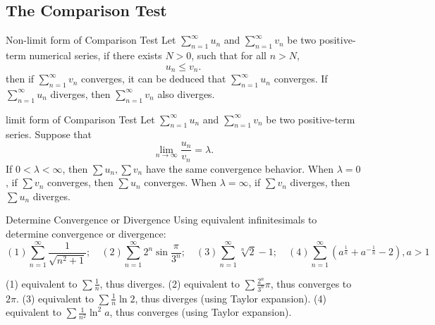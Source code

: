 \subsection{The Comparison Test}

\begin{theorem}{Non-limit form of Comparison Test}{}
  Let $\sum\limits_{n = 1}^{\infty} u_n$ and $\sum\limits_{n = 1}^{\infty}v_n$
  be two positive-term numerical series,
  if there exists $N > 0$, such that for all $n > N$,
  \begin{equation}
    u_n \leq v_n.
  \end{equation}
  then if $\sum\limits_{n = 1}^{\infty} v_n$ converges,
  it can be deduced that $\sum\limits_{n = 1}^{\infty}u_n$ converges.
  If $\sum\limits_{n = 1}^{\infty}u_n$ diverges,
  then $\sum\limits_{n = 1}^{\infty}v_n$ also diverges.
\end{theorem}


\begin{theorem}{limit form of Comparison Test}{}
  Let $\sum\limits_{n = 1}^{\infty} u_n$ and $\sum\limits_{n = 1}^{\infty}v_n$
  be two positive-term series.
  Suppose that
  \begin{equation}
    \lim \limits _{n \rightarrow \infty} \frac{u_n}{v_n} = \lambda.
  \end{equation}
  If $0 < \lambda < \infty$,
  then $\sum u_n, \sum v_n$ have the same convergence behavior.
  When $\lambda = 0$, if $\sum v_n$ converges,
  then $\sum u_n$ converges.
  When $\lambda = \infty$, if $\sum v_n$ diverges,
  then $\sum u_n$ diverges.
\end{theorem}

\begin{example}{Determine Convergence or Divergence}{}
  Using equivalent infinitesimals to determine convergence or divergence:
  \begin{equation}
    (1) \sum\limits_{n = 1}^{\infty} \frac{1}{\sqrt{n^2 + 1}}; \quad
    (2) \sum\limits_{n = 1}^{\infty} 2^n \sin \frac{\pi}{3^n}; \quad
    (3) \sum\limits_{n = 1}^{\infty} \sqrt[n]{2} - 1; \quad
    (4) \sum\limits_{n = 1}^{\infty} (a^{\frac{1}{n}} + a^{- \frac{1}{n}} - 2), a > 1
  \end{equation}
\end{example}

\begin{solution}
  (1) equivalent to $\sum \frac{1}{n}$, thus diverges.
  (2) equivalent to $\sum \frac{2^n}{3^n}\pi$, thus converges to $2\pi$.
  (3) equivalent to $\sum \frac{1}{n} \ln 2$, thus diverges (using Taylor expansion).
  (4) equivalent to $\sum \frac{1}{n^2} \ln^2 a$, thus converges (using Taylor expansion).
\end{solution}


